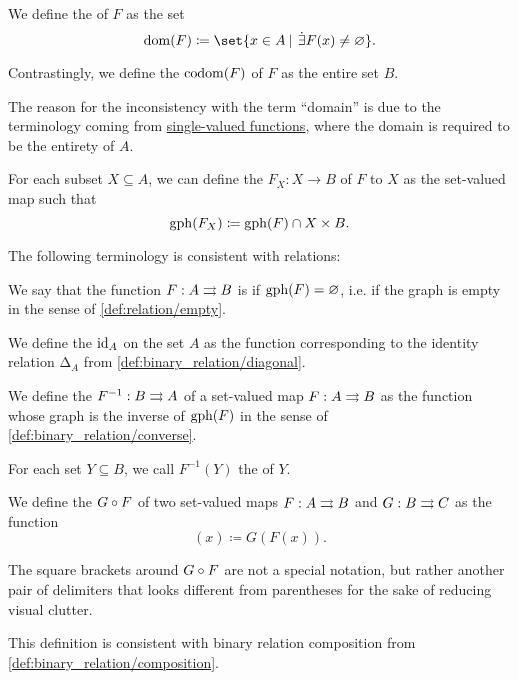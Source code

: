 \begin{definition}
\begin{thmenum}[series=def:set_valued_map]
     We define the  of \( F \) as the set
    \begin{equation*}
      \dom(F) \coloneqq \set{ x \in A \given \qexists{F(x)} \neq \varnothing }.
    \end{equation*}

     Contrastingly, we define the  \( \operatorname*{co\negthinspace\operatorname{dom}}(F) \) of \( F \) as the entire set \( B \).

    The reason for the inconsistency with the term \enquote{domain} is due to the terminology coming from \hyperref[def:function]{single-valued functions}, where the domain is required to be the entirety of \( A \).

     For each subset \( X \subseteq A \), we can define the  \( F_X: X \to B \) of \( F \) to \( X \) as the set-valued map such that
    \begin{equation*}
      \operatorname{gph}(F_X) \coloneqq \operatorname{gph}(F) \cap X \times B.
    \end{equation*}
  \end{thmenum}

  The following terminology is consistent with relations:
  \begin{thmenum}[resume=def:set_valued_map]
     We say that the function \( F: A \rightrightarrows B \) is  if \( \operatorname{gph}(F) = \varnothing \), i.e. if the graph is empty in the sense of \cref{def:relation/empty}.

     We define the  \( \operatorname{id}_A \) on the set \( A \) as the function corresponding to the identity relation \( \increment_A \) from \cref{def:binary_relation/diagonal}.

     We define the  \( F^{-1}: B \rightrightarrows A \) of a set-valued map \( F: A \rightrightarrows B \) as the function whose graph is the inverse of \( \operatorname{gph}(F) \) in the sense of \cref{def:binary_relation/converse}.

    For each set \( Y \subseteq B \), we call \( F^{-1}(Y) \) the  of \( Y \).

     We define the  \( G \bincirc F \) of two set-valued maps \( F: A \rightrightarrows B \) and \( G: B \rightrightarrows C \) as the function
    \begin{equation*}
      [G \bincirc F](x) \coloneqq G(F(x)).
    \end{equation*}

    The square brackets around \( G \bincirc F \) are not a special notation, but rather another pair of delimiters that looks different from parentheses for the sake of reducing visual clutter.

    This definition is consistent with binary relation composition from \cref{def:binary_relation/composition}.
  \end{thmenum}
\end{definition}
